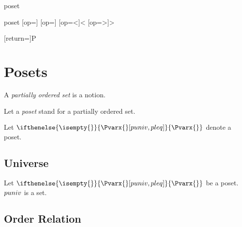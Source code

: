 \documentclass{stex}
\begin{document}
\begin{smodule}{poset}

  \begin{mathstructure}{poset}
    [op=\oldleq]{\;\oldleq\;}
    [op=\oldgeq]{\;\oldgeq\;}
    [op=<]{\;<\;}
    [op=>]{\;>\;}
  \end{mathstructure}

  [return={\poset[comp=##1]}]{\mathcal P}
  \newcommand\Pvar[1]{\ifthenelse{\isempty{#1}}{\Pvarx{}[puniv,pleq]}{\Pvarx{#1}}}

  \section{Posets}

  \begin{forthel}     
  \end{forthel}
  
  \begin{forthel}
    \begin{signature}
      A \emph{partially ordered set} is a notion.
    \end{signature}

    Let a \emph{poset} stand for a partially ordered set.

    Let $\Pvar{}$ denote a poset.
  \end{forthel}
  
  \subsection{Universe}
  
  \begin{forthel}
    \begin{signature}
      Let $\Pvar{}$ be a poset.
      $\univ{Pvar}$ is a set.
    \end{signature}
  \end{forthel}
  
  \subsection{Order Relation}
  

\end{smodule}
\end{document}
